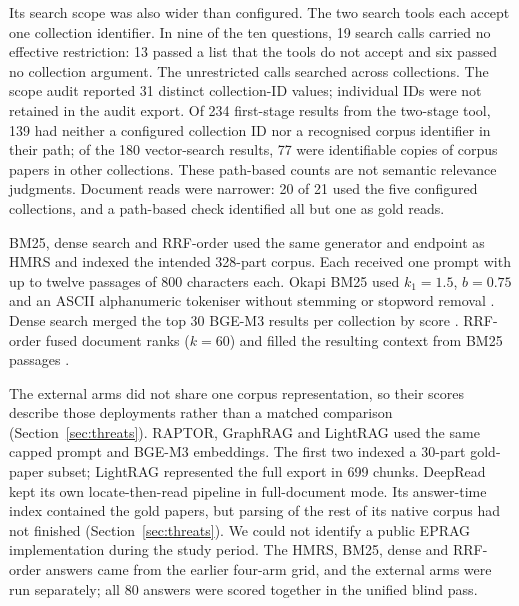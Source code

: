 Its search scope was also wider than configured. The two search tools each
accept one collection identifier. In nine of the ten questions, 19 search
calls carried no effective restriction: 13 passed a list that the tools do
not accept and six passed no collection argument. The unrestricted calls
searched across collections. The scope audit reported 31 distinct
collection-ID values; individual IDs were not retained in the audit export.
Of 234 first-stage results from the two-stage tool, 139 had neither a
configured collection ID nor a recognised corpus identifier in their path;
of the 180 vector-search results, 77 were identifiable copies of corpus papers in
other collections. These path-based counts are not semantic relevance
judgments. Document reads were narrower: 20 of 21 used the five configured
collections, and a path-based check identified all but one as gold reads.

BM25, dense search and RRF-order used the same generator and endpoint as
HMRS and indexed the intended 328-part corpus. Each received one prompt with up to twelve passages of 800
characters each. Okapi BM25 used $k_1=1.5$, $b=0.75$ and an ASCII
alphanumeric tokeniser without stemming or stopword removal \citep{bm25}.
Dense search merged the top 30 BGE-M3 results per collection by score
\citep{bge-m3}. RRF-order fused document ranks ($k=60$) and filled the
resulting context from BM25 passages \citep{rrf-cormack}.

The external arms did not share one corpus representation, so their scores
describe those deployments rather than a matched comparison
(Section~\ref{sec:threats}). RAPTOR, GraphRAG and LightRAG used the same
capped prompt and BGE-M3 embeddings. The first two indexed a 30-part gold-paper subset; LightRAG
represented the full export in 699 chunks. DeepRead kept its own
locate-then-read pipeline in full-document mode. Its answer-time index
contained the gold papers, but parsing of the rest of its native corpus had
not finished (Section~\ref{sec:threats}). We could not identify a public
EPRAG implementation during the study period. The HMRS, BM25, dense and
RRF-order answers came from the earlier four-arm grid, and the external arms
were run separately; all 80 answers were scored together in the unified
blind pass.

